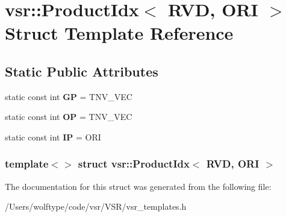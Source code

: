 \hypertarget{structvsr_1_1_product_idx_3_01_r_v_d_00_01_o_r_i_01_4}{\section{vsr\-:\-:Product\-Idx$<$ R\-V\-D, O\-R\-I $>$ Struct Template Reference}
\label{structvsr_1_1_product_idx_3_01_r_v_d_00_01_o_r_i_01_4}
}
\subsection*{Static Public Attributes}
\begin{DoxyCompactItemize}
\item 
\hypertarget{structvsr_1_1_product_idx_3_01_r_v_d_00_01_o_r_i_01_4_ab510e83993ade1ed087cee96b05f912a}{static const int {\bfseries G\-P} = T\-N\-V\-\_\-\-V\-E\-C}\label{structvsr_1_1_product_idx_3_01_r_v_d_00_01_o_r_i_01_4_ab510e83993ade1ed087cee96b05f912a}

\item 
\hypertarget{structvsr_1_1_product_idx_3_01_r_v_d_00_01_o_r_i_01_4_a4724c9bbd7a802c23bf5abc96c68c21f}{static const int {\bfseries O\-P} = T\-N\-V\-\_\-\-V\-E\-C}\label{structvsr_1_1_product_idx_3_01_r_v_d_00_01_o_r_i_01_4_a4724c9bbd7a802c23bf5abc96c68c21f}

\item 
\hypertarget{structvsr_1_1_product_idx_3_01_r_v_d_00_01_o_r_i_01_4_a7853e59a3ffdae11ae92362d16d81377}{static const int {\bfseries I\-P} = O\-R\-I}\label{structvsr_1_1_product_idx_3_01_r_v_d_00_01_o_r_i_01_4_a7853e59a3ffdae11ae92362d16d81377}

\end{DoxyCompactItemize}
\subsubsection*{template$<$$>$ struct vsr\-::\-Product\-Idx$<$ R\-V\-D, O\-R\-I $>$}



The documentation for this struct was generated from the following file\-:\begin{DoxyCompactItemize}
\item 
/\-Users/wolftype/code/vsr/\-V\-S\-R/vsr\-\_\-templates.\-h\end{DoxyCompactItemize}
